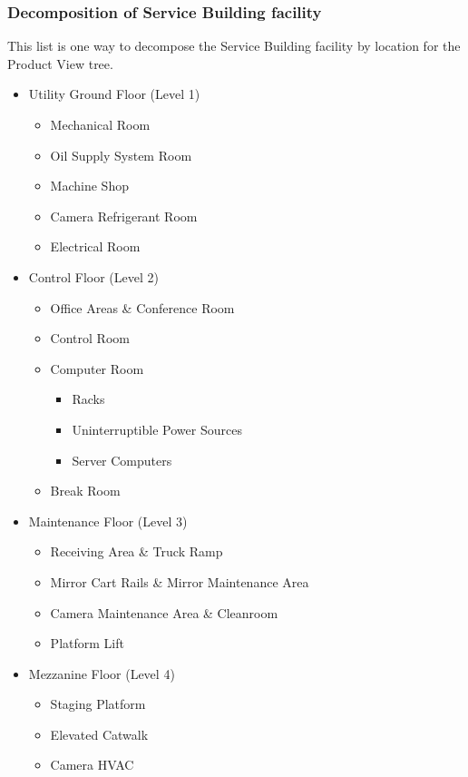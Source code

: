 \subsubsection{Decomposition of Service Building facility}

This list is one way to decompose the Service Building facility by location for the Product View tree.

\begin{small}
\begin{itemize}
	\item Utility Ground Floor (Level 1)
		\begin{itemize}
		\item Mechanical Room
		\item Oil Supply System Room
		\item Machine Shop
		\item Camera Refrigerant Room
		\item Electrical Room
		\end{itemize}

	\item Control Floor (Level 2)
		\begin{itemize}
		\item Office Areas \& Conference Room
		\item Control Room
		\item Computer Room
			\begin{itemize}
			\item Racks
			\item Uninterruptible Power Sources
			\item Server Computers
			\end{itemize}
		\item Break Room
		\end{itemize}

	\item Maintenance Floor (Level 3)
		\begin{itemize}
		\item Receiving Area \& Truck Ramp
		\item Mirror Cart Rails \& Mirror Maintenance Area
		\item Camera Maintenance Area \& Cleanroom
		\item Platform Lift
		\end{itemize}

	\item Mezzanine Floor (Level 4)
		\begin{itemize}
		\item Staging Platform
		\item Elevated Catwalk
		\item Camera HVAC
		\end{itemize}


\end{itemize}
\end{small}
